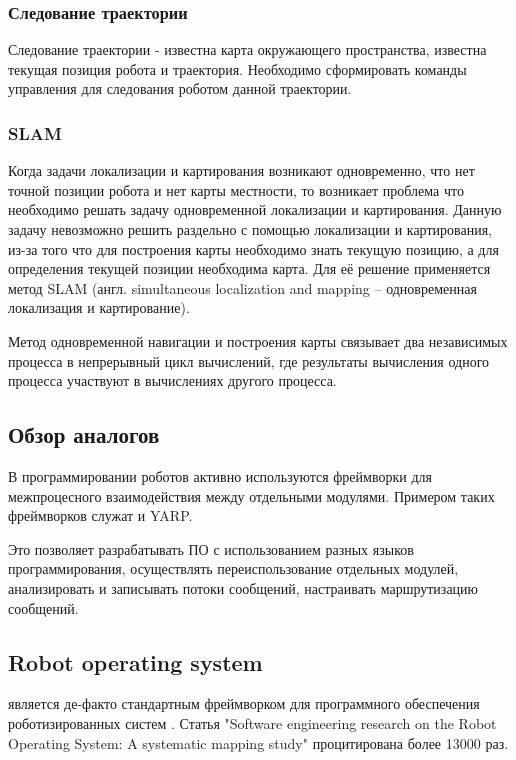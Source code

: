 \subsubsection{Следование траектории}
Следование траектории - известна карта окружающего пространства, известна
текущая позиция робота и траектория. Необходимо сформировать команды управления
для следования роботом данной траектории.

\subsubsection{SLAM}
Когда задачи локализации и картирования возникают одновременно, что нет точной
позиции робота и нет карты местности, то возникает проблема что необходимо
решать задачу одновременной локализации и картирования. Данную задачу
невозможно решить раздельно с помощью локализации и картирования, из-за того
что для построения карты необходимо знать текущую позицию, а для определения
текущей позиции необходима карта. Для её решение применяется метод SLAM (англ.
simultaneous localization and mapping -- одновременная локализация и
картирование).

Метод одновременной навигации и построения карты связывает два независимых
процесса в непрерывный цикл вычислений, где результаты вычисления одного
процесса участвуют в вычислениях другого процесса.

\subsection{Обзор аналогов}

В программировании роботов активно используются фреймворки для межпроцесного
взаимодействия между отдельными модулями. Примером
таких фреймворков служат \ros{} и YARP.

Это позволяет разрабатывать ПО с использованием разных языков программирования,
осуществлять переиспользование отдельных модулей, анализировать и записывать
потоки сообщений, настраивать маршрутизацию сообщений.

\subsection{Robot operating system}
\ros{} является де-факто стандартным фреймворком для программного обеспечения
роботизированных систем \cite{albonico2023software}. Статья
"Software engineering research on the Robot Operating System: A systematic
mapping study"
\cite{quigley2009ros} процитирована более \num{13000} раз.

